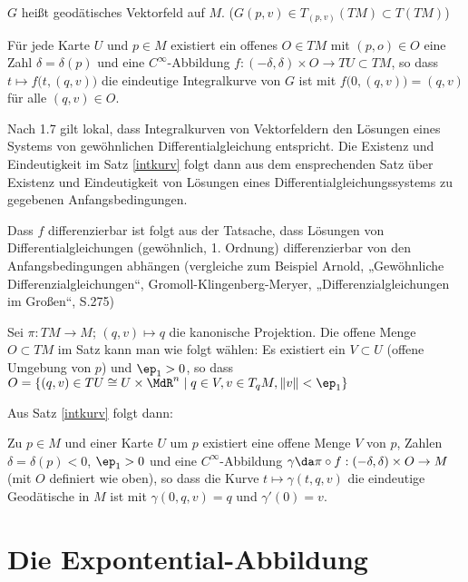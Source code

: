 \documentclass[a4paper,twoside,DIV15,BCOR12mm]{scrbook}
\begin{document}
\begin{definition}
$G$ heißt geodätisches Vektorfeld auf $M$. ($G(p,v) \in T_{(p,v)}(TM) \subset T(TM)$)
\end{definition}

\begin{satz}
Für jede Karte $U$ und $p\in M$ existiert ein offenes $O\in TM$ mit $(p,o)\in O$ eine Zahl $\delta = \delta(p)$ und eine $C^\infty$-Abbildung $f: (-\delta,\delta)\times O \to TU\subset TM$, so dass $t \mapsto f\big(t,(q,v)\big)$ die eindeutige Integralkurve von $G$ ist mit $f\big(0,(q,v)\big)=(q,v)$ für alle $(q,v)\in O$.
\label{intkurv}
\end{satz}

\begin{beweis}
Nach 1.7 gilt lokal, dass Integralkurven von Vektorfeldern den Lösungen eines Systems von gewöhnlichen Differentialgleichung entspricht.
Die Existenz und Eindeutigkeit im Satz \ref{intkurv} folgt dann aus dem ensprechenden Satz über Existenz und Eindeutigkeit von Lösungen eines Differentialgleichungssystems zu gegebenen Anfangsbedingungen.

Dass $f$ differenzierbar ist folgt aus der Tatsache, dass Lösungen von Differentialgleichungen (gewöhnlich, 1. Ordnung) differenzierbar von den Anfangsbedingungen abhängen (vergleiche zum Beispiel Arnold, „Gewöhnliche Differenzialgleichungen“, Gromoll-Klingenberg-Meryer, „Differenzialgleichungen im Großen“, S.275)

Sei $\pi: TM\to M$; $(q,v)\mapsto q$ die kanonische Projektion. Die offene Menge $O\subset TM$ im Satz kann man wie folgt wählen: Es existiert ein $V\subset U$ (offene Umgebung von $p$) und $\ep_1>0$, so dass $O=\{(q,v)\in TU \cong U\times \MdR^n \mid q \in V, v\in T_qM, \|v\|<\ep_1\}$
\end{beweis}

Aus Satz \ref{intkurv} folgt dann:
\begin{satz}
\label{lokgeo}
Zu $p\in M$ und einer Karte $U$ um $p$ existiert eine offene Menge $V$ von $p$, Zahlen $\delta=\delta(p)<0$, $\ep_1>0$  und eine $C^\infty$-Abbildung 
$\gamma \da \pi \circ f : (-\delta, \delta) \times O \to M$ (mit $O$ definiert wie oben), so dass die Kurve $t\mapsto \gamma(t,q,v)$ die  eindeutige Geodätische in $M$ ist mit $\gamma(0,q,v)=q$ und $\gamma'(0)=v$.
\end{satz}

\section{Die Expontential-Abbildung}
\end{document}
